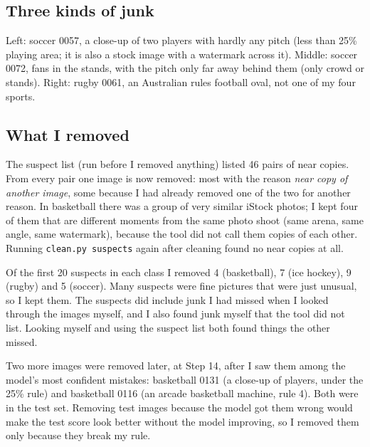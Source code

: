 \documentclass[11pt]{article}
\begin{document}
\subsection*{Three kinds of junk}
\begin{center}
\hfill
{}\hfill
{}
\end{center}
Left: soccer 0057, a close-up of two players with hardly any pitch (less than
25\% playing area; it is also a stock image with a watermark across it). Middle:
soccer 0072, fans in the stands, with the pitch only far away behind them (only
crowd or stands). Right: rugby 0061, an Australian rules football oval, not one
of my four sports.

\subsection*{What I removed}


The suspect list (run before I removed anything) listed 46 pairs of near copies.
From every pair one image is now removed: most with the reason
\textit{near copy of another image}, some because I had already removed one of
the two for another reason. In basketball there was a group of very similar
iStock photos; I kept four of them that are different moments from the same photo
shoot (same arena, same angle, same watermark), because the tool did not call
them copies of each other. Running \texttt{clean.py suspects} again after cleaning
found no near copies at all.

Of the first 20 suspects in each class I removed 4 (basketball), 7 (ice hockey),
9 (rugby) and 5 (soccer). Many suspects were fine pictures that were just
unusual, so I kept them.
The suspects did include junk I had missed when I looked through the images
myself, and I also found junk myself that the tool did not list. Looking myself
and using the suspect list both found things the other missed.

Two more images were removed later, at Step 14, after I saw them among the
model's most confident mistakes: basketball 0131 (a close-up of players, under
the 25\% rule) and basketball 0116 (an arcade basketball machine, rule 4). Both
were in the test set. Removing test images because the model got them wrong would
make the test score look better without the model improving, so I removed them
only because they break my rule.
\end{document}
